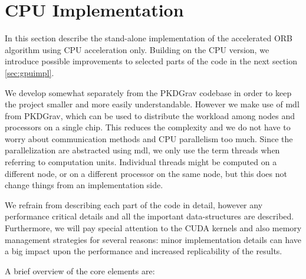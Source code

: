 \documentclass[]{article}
\begin{document}
\begin{comment}
\begin{figure}
\begin{center}
\begin{tikzpicture}
\begin{axis}[xmin = -1, xmax = 13, ymin=-1, ymax=6]
\addplot[domain = 0:12,blue] {ln(1024) / ln(2) * 
(\p * x / (900 * 6))
+  x / (50 * 6) + x /(170 * 2)};
\addplot[domain = 0:12,blue] {ln(1024 * 16) / ln(2) * 
(\p * x / (900 * 6))
+  x / (50 * 6) + x /(170 * 2)};
\end{axis}
\end{tikzpicture}
\end{center}
\caption{??}
\label{fig:exectimes}
\end{figure}

\end{comment}

\newpage
\section{CPU Implementation}

In this section describe the stand-alone implementation of the accelerated ORB algorithm using CPU acceleration only. Building on the CPU version, we introduce possible improvements to selected parts of the code in the next section \ref{sec:gpuimpl}. 

We develop somewhat separately from the PKDGrav codebase in order to keep the project smaller and more easily understandable. However we make use of mdl from PKDGrav, which can be used to distribute the workload among nodes and processors on a single chip. This reduces the complexity and we do not have to worry about communication methods and CPU parallelism too much. Since the parallelization are abstracted using mdl, we only use the term threads when referring to computation units. Individual threads might be computed on a different node, or on a different processor on the same node, but this does not change things from an implementation side.

We refrain from describing each part of the code in detail, however any performance critical details and all the important data-structures are described. Furthermore, we will pay special attention to the CUDA kernels and also memory management strategies for several reasons: minor implementation details can have a big impact upon the performance and increased replicability of the results.

A brief overview of the core elements are:
\end{document}
